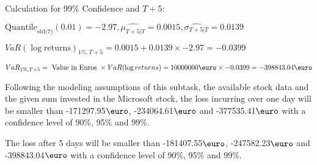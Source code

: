 Calculation for 99\% Confidence and $T+5$:

\indent\indent $\text{Quantile}_\text{std(7)}(0.01) = -2.97,\hat{\mu_{T+5|T}} = 0.0015, \hat{\sigma_{T+5|T}} = 0.0139$

\indent\indent $VaR(\log \text{returns})_{1\%, T + 5} = 0.0015 + 0.0139\times-2.97 = -0.0399$

\indent\indent $VaR_{1\%, T + 5} = \text{ Value in Euros } \times VaR(\log returns) = 10 000 000 \text{\euro} \times-0.0399 = -398843.04 \text{\euro}$\newline


Following the modeling assumptions of this subtask, the available stock data and the given sum invested in the Microsoft stock, the loss incurring over one day will be smaller than -171297.95$\text{\euro}$, -234064.61$\text{\euro}$  and -377535.41$\text{\euro}$  with a confidence level of 90\%, 95\%  and 99\%.

The loss after 5 days will be smaller than -181407.55$\text{\euro}$, -247582.23$\text{\euro}$  and -398843.04$\text{\euro}$  with a confidence level of 90\%, 95\%  and 99\%.

